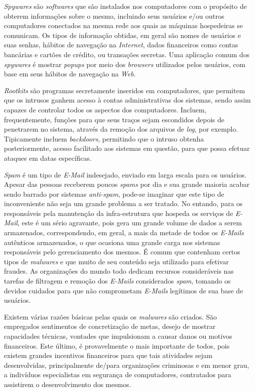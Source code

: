 \textit{Spywares} são \textit{softwares} que são instalados nos computadores com o propósito de obterem informações sobre o mesmo, incluindo seus usuários e/ou outros computadores conectados na mesma rede aos quais as máquinas hospedeiras se comunicam. Os tipos de informação obtidas, em geral são nomes de usuários e suas senhas, hábitos de navegação na \textit{Internet}, dados financeiros como contas bancárias e cartões de crédito, ou transações secretas. Uma aplicação comum dos \textit{spywares} é mostrar \textit{popups} por meio dos \textit{browsers} utilizados pelos usuários, com base em seus hábitos de navegação na \textit{Web}.

\textit{Rootkits} são programas secretamente inseridos em computadores, que permitem que os intrusos ganhem acesso à contas administrativas dos sistemas, sendo assim capazes de controlar todos os aspectos dos computadores. Incluem, frequentemente, funções para que seus traços sejam escondidos depois de penetrarem no sistema, através da remoção dos arquivos de \textit{log}, por exemplo. Tipicamente incluem \textit{backdoors}, permitindo que o intruso obtenha posteriormente, acesso facilitado aos sistemas em questão, para que possa efetuar ataques em datas específicas.

\textit{Spam} é um tipo de \textit{E-Mail} indesejado, enviado em larga escala para os usuários. Apesar das pessoas receberem poucos \textit{spams} por dia e sua grande maioria acabar sendo barrado por sistemas \textit{anti-spam}, pode-se imaginar que este tipo de inconveniente não seja um grande problema a ser tratado. No entando, para os responsáveis pela manutenção da infra-estrutura que hospeda os serviços de \textit{E-Mail}, este é um sério agravante, pois gera um grande volume de dados a serem armazenados, correspondendo, em geral, a mais da metade de todos os \textit{E-Mails} autênticos armazenados, o que ocasiona uma grande carga nos sistemas responsáveis pelo gerenciamento dos mesmos. É comum que contenham certos tipos de \textit{malwares} e que muito de seu conteúdo seja utilizado para efetivar fraudes. As organizações do mundo todo dedicam recursos consideráveis nas tarefas de filtragem e remoção dos \textit{E-Mails} considerados \textit{spam}, tomando os devidos cuidados para que não comprometam \textit{E-Mails} legítimos de sua base de usuários.

Existem várias razões básicas pelas quais os \textit{malwares} são criados. São empregados sentimentos de concretização de metas, desejo de mostrar capacidades técnicas, vontades que impulsionam a causar danos ou motivos financeiros. Este último, é provavelmente o mais importante de todos, pois existem grandes incentivos financeiros para que tais atividades sejam desenvolvidas, principalmente de/para organizações criminosas e em menor grau, a indivíduos especialistas em segurança de computadores, contratados para assistirem o desenvolvimento dos mesmos.

